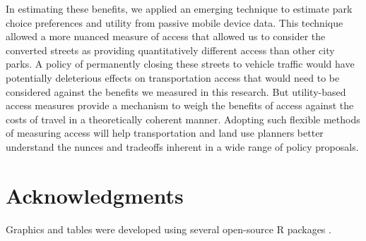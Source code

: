 \documentclass[3p, authoryear, review]{elsarticle} %
\begin{document}
In estimating these benefits, we applied an emerging technique to estimate park
choice preferences and utility from passive mobile device data. This technique
allowed a more nuanced measure of access that allowed us to consider the
converted streets as providing quantitatively different access than other city
parks. A policy of permanently closing these streets to vehicle traffic would
have potentially deleterious effects on transportation access that would need to
be considered against the benefits we measured in this research. But
utility-based access measures provide a mechanism to weigh the benefits of
access against the costs of travel in a theoretically coherent manner. Adopting
such flexible methods of measuring access will help transportation and land use
planners better understand the nunces and tradeoffs inherent in a wide range of
policy proposals.

\hypertarget{acknowledgments}{%
\section*{Acknowledgments}\label{acknowledgments}}

Graphics and tables were developed using several open-source R packages
\citep{ggmap, modelsummary, wesanderson}.


\end{document}
